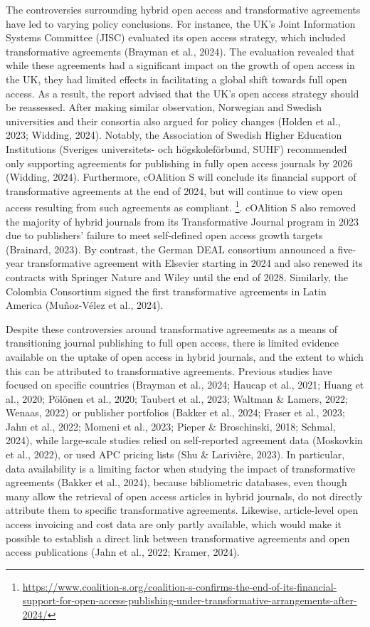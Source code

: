 \documentclass[a4paper,man,floatsintext,longtable,noextraspace,12pt]{apa6}
\begin{document}
The controversies surrounding hybrid open access and transformative
agreements have led to varying policy conclusions. For instance, the
UK's Joint Information Systems Committee (JISC) evaluated its open
access strategy, which included transformative agreements (Brayman et
al., 2024). The evaluation revealed that while these agreements had a
significant impact on the growth of open access in the UK, they had
limited effects in facilitating a global shift towards full open access.
As a result, the report advised that the UK's open access strategy
should be reassessed. After making similar observation, Norwegian and
Swedish universities and their consortia also argued for policy changes
(Holden et al., 2023; Widding, 2024). Notably, the Association of
Swedish Higher Education Institutions (Sveriges universitets- och
högskoleförbund, SUHF) recommended only supporting agreements for
publishing in fully open access journals by 2026 (Widding, 2024).
Furthermore, cOAlition S will conclude its financial support of
transformative agreements at the end of 2024, but will continue to view
open access resulting from such agreements as compliant. \footnote{\url{https://www.coalition-s.org/coalition-s-confirms-the-end-of-its-financial-support-for-open-access-publishing-under-transformative-arrangements-after-2024/}}.
cOAlition S also removed the majority of hybrid journals from its
Transformative Journal program in 2023 due to publishers' failure to
meet self-defined open access growth targets (Brainard, 2023). By
contrast, the German DEAL consortium announced a five-year
transformative agreement with Elsevier starting in 2024 and also renewed
its contracts with Springer Nature and Wiley until the end of 2028.
Similarly, the Colombia Consortium signed the first transformative
agreements in Latin America (Muñoz-Vélez et al., 2024).

Despite these controversies around transformative agreements as a means
of transitioning journal publishing to full open access, there is
limited evidence available on the uptake of open access in hybrid
journals, and the extent to which this can be attributed to
transformative agreements. Previous studies have focused on specific
countries (Brayman et al., 2024; Haucap et al., 2021; Huang et al.,
2020; Pölönen et al., 2020; Taubert et al., 2023; Waltman \& Lamers,
2022; Wenaas, 2022) or publisher portfolios (Bakker et al., 2024; Fraser
et al., 2023; Jahn et al., 2022; Momeni et al., 2023; Pieper \&
Broschinski, 2018; Schmal, 2024), while large-scale studies relied on
self-reported agreement data (Moskovkin et al., 2022), or used APC
pricing lists (Shu \& Larivière, 2023). In particular, data availability
is a limiting factor when studying the impact of transformative
agreements (Bakker et al., 2024), because bibliometric databases, even
though many allow the retrieval of open access articles in hybrid
journals, do not directly attribute them to specific transformative
agreements. Likewise, article-level open access invoicing and cost data
are only partly available, which would make it possible to establish a
direct link between transformative agreements and open access
publications (Jahn et al., 2022; Kramer, 2024).
\end{document}
